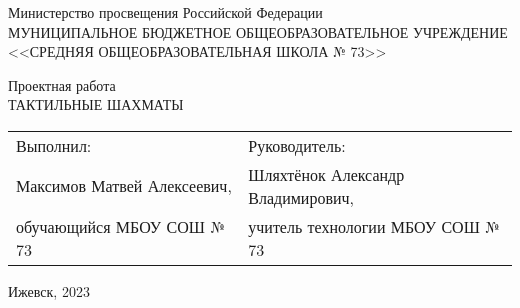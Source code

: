 \begin{titlepage}
    \begin{center}
        {\small
            Министерство просвещения Российской Федерации \\
            МУНИЦИПАЛЬНОЕ БЮДЖЕТНОЕ ОБЩЕОБРАЗОВАТЕЛЬНОЕ УЧРЕЖДЕНИЕ \\
            <<СРЕДНЯЯ ОБЩЕОБРАЗОВАТЕЛЬНАЯ ШКОЛА № 73>>
        }
    \end{center}
    \vspace{13.0em}
    \begin{center}
        {\LARGE
            Проектная работа\\
            ТАКТИЛЬНЫЕ ШАХМАТЫ\\
        }
        \vspace{13em}
        {\small
            \begin{tabular}{p{}p{}}
                Выполнил:                  & Руководитель:\\
                Максимов Матвей Алексеевич,& Шляхтёнок Александр Владимирович,\\
                обучающийся МБОУ СОШ № 73  & учитель технологии МБОУ СОШ № 73\\
            \end{tabular}
            \vfill
            Ижевск, 2023
        }

    \end{center}
\end{titlepage}
